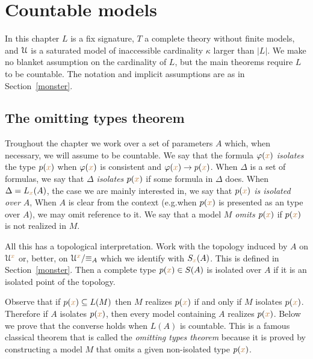 \chapter{Countable models}
\label{countable}

\def\ceq#1#2#3{\parbox[b]{30ex}{$\displaystyle #1$}\parbox[b]{6ex}{\hfil$#2$}$\displaystyle #3$}

In this chapter $L$ is a fix signature, $T$ a complete theory without finite models, and $\EuScript U$ is a saturated model of inaccessible cardinality $\kappa$ larger than $|L|$.
We make no blanket assumption on the cardinality of $L$, but the main theorems require $L$ to be countable.
The notation and implicit assumptions are as in Section~\ref{monster}.

\section{The omitting types theorem}\label{omttingtype}

Troughout the chapter we work over a set of parameters $A$ which, when necessary, we will assume to be countable.
We say that the formula $\varphi({\color{brown} x})$ \emph{isolates\/} the type $p({\color{brown} x})$ when $\varphi({\color{brown} x})$ is consistent and $\varphi({\color{brown} x})\rightarrow p({\color{brown} x})$.
When $\Delta$ is a set of formulas, we say that \emph{$\Delta$ isolates $p({\color{brown} x})$\/} if some formula in $\Delta$ does.
When $\Delta=L_{{\color{brown} x}}(A)$, the case we are mainly interested in, we say that \emph{$p({\color{brown} x})$ is isolated over\/} $A$, 
When $A$ is clear from the context (e.g.\@ when $p({\color{brown} x})$ is presented as an type over $A$), we may omit reference to it.
We say that a model \emph{$M$ omits $p({\color{brown} x})$\/} if $p({\color{brown} x})$ is not realized in $M$.

All this has a topological interpretation.
Work with the topology induced by $A$ on $\EuScript U^{\color{brown} x}$ or, better, on $\EuScript U^{\color{brown} x}/{\equiv_A}$ which we identify with $S_{\color{brown} x}(A)$.
This is defined in Section~\ref{monster}.
Then a complete type $p({\color{brown} x})\in S(A)$ is isolated over $A$ if it is an isolated point of the topology.

Observe that if $p({\color{brown} x})\subseteq L(M)$ then $M$ realizes $p({\color{brown} x})$ if and only if $M$ isolates $p({\color{brown} x})$.
Therefore if $A$ isolates $p({\color{brown} x})$, then every model containing $A$ realizes $p({\color{brown} x})$.
Below we prove that the converse holds when $L(A)$ is countable.
This is a famous classical theorem that is called the \textit{omitting types theorem\/} because it is proved by constructing a model $M$ that omits a given non-isolated type $p({\color{brown} x})$.

